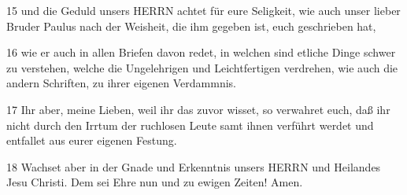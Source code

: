 \par 15 und die Geduld unsers HERRN achtet für eure Seligkeit, wie auch unser lieber Bruder Paulus nach der Weisheit, die ihm gegeben ist, euch geschrieben hat,
\par 16 wie er auch in allen Briefen davon redet, in welchen sind etliche Dinge schwer zu verstehen, welche die Ungelehrigen und Leichtfertigen verdrehen, wie auch die andern Schriften, zu ihrer eigenen Verdammnis.
\par 17 Ihr aber, meine Lieben, weil ihr das zuvor wisset, so verwahret euch, daß ihr nicht durch den Irrtum der ruchlosen Leute samt ihnen verführt werdet und entfallet aus eurer eigenen Festung.
\par 18 Wachset aber in der Gnade und Erkenntnis unsers HERRN und Heilandes Jesu Christi. Dem sei Ehre nun und zu ewigen Zeiten! Amen.

